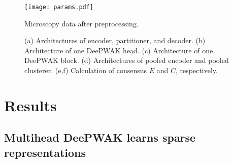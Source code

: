 \documentclass{article}
\begin{document}
\begin{figure}
  \texttt{[image: params.pdf]}
    \caption{Microscopy data after preprocessing. }
    \label{fig:}
\end{figure}
  
\begin{figure}
     \begin{subfigure}[b]{0.5\textwidth}
        
         \caption{}
         \label{fig:}
     \end{subfigure}
     \hfill
     \begin{subfigure}[b]{0.5\textwidth}
        
         \caption{}
         \label{fig:}
     \end{subfigure}

     \vspace{1cm}
     \begin{subfigure}[b]{0.5\textwidth}
        
         \caption{}
         \label{fig:}
     \end{subfigure}
     \hfill
     \begin{subfigure}[b]{\textwidth}
       
       \caption{}
       \label{fig:}
     \end{subfigure}
     

     \vspace{1cm}
     \begin{subfigure}[b]{0.5\textwidth}
        
         \caption{}
         \label{fig:}
     \end{subfigure}
     \hfill
     \begin{subfigure}[b]{\textwidth}
       
       \caption{}
       \label{fig:}
     \end{subfigure}
     \caption{(a) Architectures of encoder, partitioner, and decoder.
       (b) Architecture of one DeePWAK head.
       (c) Architecture of one DeePWAK block.
       (d) Architectures of pooled encoder and pooled clusterer.
       (e,f) Calculation of consensus $E$ and $C$, respectively.}
     \label{fig:}
\end{figure}


\section{Results}

\subsection{Multihead DeePWAK learns sparse representations}
\end{document}
